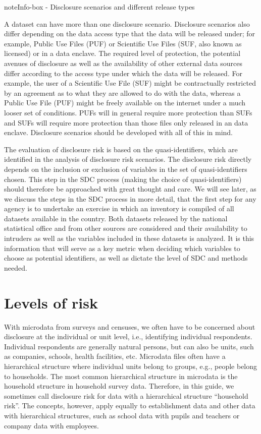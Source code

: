 \documentclass[letterpaper,10pt,english]{sphinxmanual}
\begin{document}
\begin{sphinxadmonition}{note}{Info-box - Disclosure scenarios and different release types}

A dataset can have more than one disclosure scenario. Disclosure scenarios
also differ depending on the data access type that the data will be released
under; for example, Public Use Files (PUF) or Scientific Use Files (SUF, also
known as licensed) or in a data enclave. The required level of protection,
the potential avenues of disclosure as well as the availability of other external
data sources differ according to the access type under which the data will be
released. For example, the user of a Scientific Use File (SUF) might be
contractually restricted by an agreement as to what they are allowed to do
with the data, whereas a Public Use File (PUF) might be freely available on
the internet under a much looser set of conditions. PUFs will in general require
more protection than SUFs and SUFs will require more protection than those files
only released in an data enclave. Disclosure scenarios should be developed with
all of this in mind.
\end{sphinxadmonition}

The evaluation of disclosure risk is based on the quasi-identifiers,
which are identified in the analysis of disclosure risk scenarios. The
disclosure risk directly depends on the inclusion or exclusion of
variables in the set of quasi-identifiers chosen. This step in the SDC
process (making the choice of quasi-identifiers) should therefore be
approached with great thought and care. We will see later, as we discuss
the steps in the SDC process in more detail, that the first step for any
agency is to undertake an exercise in which an inventory is compiled of
all datasets available in the country. Both datasets released by the
national statistical office and from other sources are considered and
their availability to intruders as well as the variables included in
these datasets is analyzed. It is this information that will serve as a
key metric when deciding which variables to choose as potential
identifiers, as well as dictate the level of SDC and methods needed.


\section{Levels of risk}
\label{\detokenize{measure_risk:levels-of-risk}}
With microdata from surveys and censuses, we often have to be concerned
about disclosure at the individual or unit level, i.e., identifying
individual respondents. Individual respondents are generally natural
persons, but can also be units, such as companies, schools, health
facilities, etc. Microdata files often have a hierarchical structure
where individual units belong to groups, e.g., people belong to
households. The most common hierarchical structure in microdata is the
household structure in household survey data. Therefore, in this guide,
we sometimes call disclosure risk for data with a hierarchical structure
“household risk”. The concepts, however, apply equally to establishment
data and other data with hierarchical structures, such as school data
with pupils and teachers or company data with employees.
\end{document}

